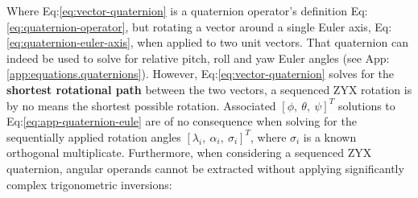 Where Eq:\ref{eq:vector-quaternion} is a quaternion operator's definition Eq:\ref{eq:quaternion-operator}, but rotating a vector around a single Euler axis, Eq:\ref{eq:quaternion-euler-axis}, when applied to two unit vectors. That quaternion can indeed be used to solve for relative pitch, roll and yaw Euler angles (see App:\ref{app:equations.quaternions}). However, Eq:\ref{eq:vector-quaternion} solves for the \textbf{shortest rotational path} between the two vectors, a sequenced ZYX rotation is by no means the shortest possible rotation. Associated $[\phi,~\theta,~\psi]^T$ solutions to Eq:\ref{eq:app-quaternion-eule} are of no consequence when solving for the sequentially applied rotation angles $[\lambda_i,~\alpha_i,~\sigma_i]^T$, where $\sigma_i$ is a known orthogonal multiplicate. Furthermore, when considering a sequenced ZYX quaternion, angular operands cannot be extracted without applying significantly complex trigonometric inversions:
